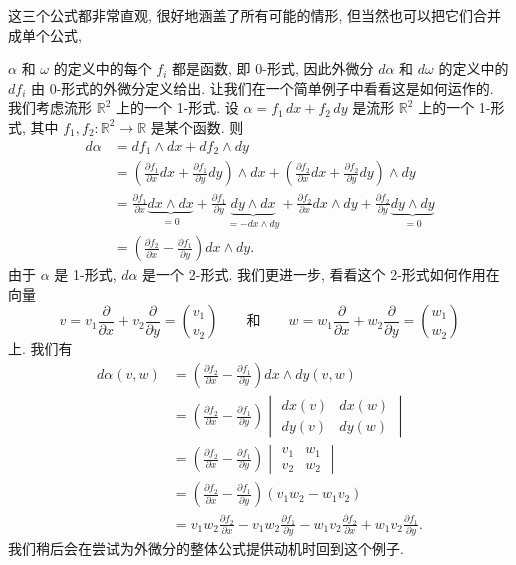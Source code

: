这三个公式都非常直观, 很好地涵盖了所有可能的情形, 但当然也可以把它们合并成单个公式, 
\begin{center}
\end{center}

$\alpha$ 和 $\omega$ 的定义中的每个 $f_i$ 都是函数, 即 0-形式, 因此外微分 $d\alpha$ 和 $d\omega$ 的定义中的 $df_i$ 由 0-形式的外微分定义给出. 让我们在一个简单例子中看看这是如何运作的. 我们考虑流形 $\mathbb{R}^2$ 上的一个 1-形式. 设 $\alpha=f_1\,dx+f_2\,dy$ 是流形 $\mathbb{R}^2$ 上的一个 1-形式, 其中 $f_1,f_2:\mathbb{R}^2\to\mathbb{R}$ 是某个函数. 则
\begin{align*}
d\alpha&=df_1\wedge dx+df_2\wedge dy\\
&=\left(\frac{\partial f_1}{\partial x}dx+\frac{\partial f_1}{\partial y}dy\right)\wedge dx
+\left(\frac{\partial f_2}{\partial x}dx+\frac{\partial f_2}{\partial y}dy\right)\wedge dy\\
&=\frac{\partial f_1}{\partial x}\underbrace{dx\wedge dx}_{=0}+\frac{\partial f_1}{\partial y}\underbrace{dy\wedge dx}_{=-dx\wedge dy}
+\frac{\partial f_2}{\partial x}dx\wedge dy+\frac{\partial f_2}{\partial y}\underbrace{dy\wedge dy}_{=0}\\
&=\left(\frac{\partial f_2}{\partial x}-\frac{\partial f_1}{\partial y}\right)dx\wedge dy.
\end{align*}
由于 $\alpha$ 是 1-形式, $d\alpha$ 是一个 2-形式. 我们更进一步, 看看这个 2-形式如何作用在向量
\[
v=v_1\frac{\partial}{\partial x}+v_2\frac{\partial}{\partial y}=\binom{v_1}{v_2}
\qquad\text{和}\qquad
w=w_1\frac{\partial}{\partial x}+w_2\frac{\partial}{\partial y}=\binom{w_1}{w_2}
\]
上. 我们有
\begin{align*}
d\alpha(v,w)&=\left(\frac{\partial f_2}{\partial x}-\frac{\partial f_1}{\partial y}\right)dx\wedge dy(v,w)\\
&=\left(\frac{\partial f_2}{\partial x}-\frac{\partial f_1}{\partial y}\right)
\begin{vmatrix}dx(v)&dx(w)\\dy(v)&dy(w)\end{vmatrix}\\
&=\left(\frac{\partial f_2}{\partial x}-\frac{\partial f_1}{\partial y}\right)
\begin{vmatrix}v_1&w_1\\v_2&w_2\end{vmatrix}\\
&=\left(\frac{\partial f_2}{\partial x}-\frac{\partial f_1}{\partial y}\right)(v_1w_2-w_1v_2)\\
&=v_1w_2\frac{\partial f_2}{\partial x}-v_1w_2\frac{\partial f_1}{\partial y}-w_1v_2\frac{\partial f_2}{\partial x}+w_1v_2\frac{\partial f_1}{\partial y}.
\end{align*}
我们稍后会在尝试为外微分的整体公式提供动机时回到这个例子.

